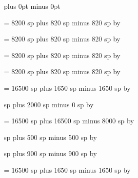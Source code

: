 \def\endofglyph#1{%
\ifcase#1%
\hskip\interglyphspace %
\or%
\hskip\zerowidthspace %
\or%
\hskip\alterationspace %
\or%
\hskip\punctuminclinatumshift %
\or%
\hskip\bispace %
\or%
\hskip\trispace %
\or%
\hskip\spaceaftersigns %
\or%
\hskip\punctuminclinatumanddebilisshift %
\or%
\hskip\punctuminclinatumdebilisshift %
\fi%
\penalty 10001%
\relax%
}


\newskip\zerowidthspace
\zerowidthspace=0pt plus 0pt minus 0pt

\newskip\interglyphspace
\interglyphspace = 8200 sp plus 820 sp minus 820 sp
\multiply\interglyphspace by \factor

\newskip\alterationspace
\alterationspace = 8200 sp plus 820 sp minus 820 sp
\multiply\alterationspace by \factor

\newskip\interelementspace
\interelementspace = 8200 sp plus 820 sp minus 820 sp
\multiply\interelementspace by \factor

\newskip\largerspace
\largerspace = 8200 sp plus 820 sp minus 820 sp
\multiply\largerspace by \factor

\newskip\glyphspace
\glyphspace = 16500 sp plus 1650 sp minus 1650 sp
\multiply\glyphspace by \factor

\newskip\intersyllablespace
{} sp plus 2000 sp minus 0 sp
\multiply\intersyllablespace by \factor

\newskip\spacebeforecusto
\spacebeforecusto = 16500 sp plus 16500 sp minus 8000 sp
\multiply\spacebeforecusto by \factor

\newskip\spacebeforesigns
{} sp plus 500 sp minus 500 sp
\multiply\spacebeforesigns by \factor

\newskip\spaceaftersigns
{} sp plus 900 sp minus 900 sp
\multiply\spaceaftersigns by \factor

\newskip\spaceafterlineclef
\spaceafterlineclef = 16500 sp plus 1650 sp minus 1650 sp
\multiply\spaceafterlineclef by \factor

